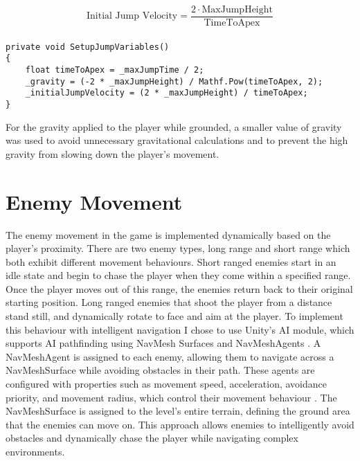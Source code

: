 \documentclass[10pt]{final_report}
\begin{document}
\begin{equation}
\text{Initial Jump Velocity} = \frac{2 \cdot \text{MaxJumpHeight}}{\text{TimeToApex}}
\end{equation}
\paragraph{}
\begin{verbatim}
private void SetupJumpVariables()
{
    float timeToApex = _maxJumpTime / 2;
    _gravity = (-2 * _maxJumpHeight) / Mathf.Pow(timeToApex, 2);
    _initialJumpVelocity = (2 * _maxJumpHeight) / timeToApex;
}
\end{verbatim}
For the gravity applied to the player while grounded, a smaller value of gravity was used to avoid unnecessary gravitational calculations and to prevent the high gravity from slowing down the player's movement. \newline

\section{Enemy Movement}\label{enemy_movement}
The enemy movement in the game is implemented dynamically based on the player's proximity. There are two enemy types, long range and short range which both exhibit different movement behaviours. Short ranged enemies start in an idle state and begin to chase the player when they come within a specified range. Once the player moves out of this range, the enemies return back to their original starting position. Long ranged enemies that shoot the player from a distance stand still, and dynamically rotate to face and aim at the player. To implement this behaviour with intelligent navigation I chose to use Unity's AI module, which supports AI pathfinding using NavMesh Surfaces and NavMeshAgents \cite{unity2024_AI}. 
A NavMeshAgent is assigned to each enemy, allowing them to navigate across a NavMeshSurface while avoiding obstacles in their path. These agents are configured with properties such as movement speed, acceleration, avoidance priority, and movement radius, which control their movement behaviour \cite{unity2024_NavAgent}. The NavMeshSurface is assigned to the level's entire terrain, defining the ground area that the enemies can move on. This approach allows enemies to intelligently avoid obstacles and dynamically chase the player while navigating complex environments. \newline
\end{document}
